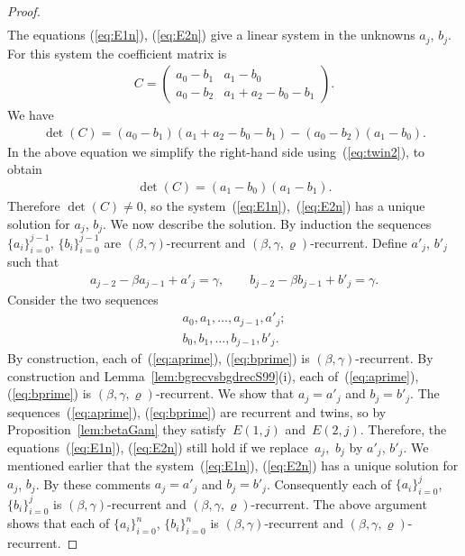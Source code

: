 \documentclass[pdftex]{sigma}
\numberwithin{equation}{section}
\begin{document}
\begin{proof}
\begin{gather}
\end{gather}
The equations (\ref{eq:E1n}), (\ref{eq:E2n}) give a linear system in the unknowns $a_j$, $b_j$. For this system the coefficient matrix
is
\begin{gather*}
C =
	 \left(
	 \begin{matrix}
	 a_0-b_1 & a_1-b_0 \\
	 a_0-b_2 & a_1+a_2-b_0-b_1
		 \end{matrix}
		 \right).
\end{gather*}
We have
\begin{gather*}
\det (C) = (a_0-b_1)(a_1+a_2-b_0-b_1)-(a_0-b_2) (a_1-b_0).
\end{gather*}
In the above equation we simplify the right-hand side using~(\ref{eq:twin2}), to obtain
\begin{gather*}
\det (C) = (a_1-b_0)(a_1-b_1).
\end{gather*}
Therefore $\det (C) \not=0$, so the system~(\ref{eq:E1n}),~(\ref{eq:E2n})
has a unique solution for $a_j$, $b_j$.
We now describe the solution. By induction the sequences
$\lbrace a_i \rbrace_{i=0}^{j-1}$,
$\lbrace b_i \rbrace_{i=0}^{j-1}$ are
$(\beta,\gamma)$-recurrent and
$(\beta,\gamma,\varrho)$-recurrent.
Define $a'_j$, $b'_j$ such that
\begin{gather*}
a_{j-2}-\beta a_{j-1} + a'_j = \gamma,
\qquad
b_{j-2}-\beta b_{j-1} + b'_j = \gamma.
\end{gather*}
Consider the two sequences
\begin{gather}
a_0,a_1, \ldots, a_{j-1}, a'_j;\label{eq:aprime}\\
b_0,b_1, \ldots, b_{j-1}, b'_j.\label{eq:bprime}
\end{gather}
By construction, each of~(\ref{eq:aprime}),
(\ref{eq:bprime}) is $(\beta,\gamma)$-recurrent.
By construction and
Lemma~\ref{lem:bgrecvsbgdrecS99}(i),
each of~(\ref{eq:aprime}),
(\ref{eq:bprime}) is $(\beta,\gamma,\varrho)$-recurrent.
We show that $a_j=a'_j$ and
 $b_j=b'_j$.
The sequences~(\ref{eq:aprime}),
(\ref{eq:bprime}) are recurrent and twins, so by
Proposition~\ref{lem:betaGam} they satisfy~$E(1,j)$ and~$E(2,j)$.
 Therefore, the equations~(\ref{eq:E1n}),
(\ref{eq:E2n}) still hold if we replace~$a_j$,~$b_j$
by $a'_j$, $b'_j$. We mentioned earlier that
the system~(\ref{eq:E1n}), (\ref{eq:E2n}) has a unique solution for
$a_j$, $b_j$.
By these comments $a_j=a'_j$ and $b_j=b'_j$.
Consequently each of $\lbrace a_i \rbrace_{i=0}^{j}$,
$\lbrace b_i \rbrace_{i=0}^{j}$ is
$(\beta,\gamma)$-recurrent and
$(\beta,\gamma,\varrho)$-recurrent.
The above argument shows that each of
 $\lbrace a_i \rbrace_{i=0}^{n}$,
$\lbrace b_i \rbrace_{i=0}^{n}$ is
$(\beta,\gamma)$-recurrent and
$(\beta,\gamma,\varrho)$-recurrent.
\end{proof}
\end{document}
